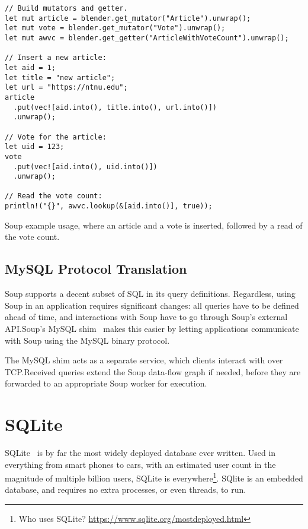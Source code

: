 \begin{listing}[H]
  \begin{verbatim}
// Build mutators and getter.
let mut article = blender.get_mutator("Article").unwrap();
let mut vote = blender.get_mutator("Vote").unwrap();
let mut awvc = blender.get_getter("ArticleWithVoteCount").unwrap();

// Insert a new article:
let aid = 1;
let title = "new article";
let url = "https://ntnu.edu";
article
  .put(vec![aid.into(), title.into(), url.into()])
  .unwrap();

// Vote for the article:
let uid = 123;
vote
  .put(vec![aid.into(), uid.into()])
  .unwrap();

// Read the vote count:
println!("{}", awvc.lookup(&[aid.into()], true));
  \end{verbatim}

  \caption{Soup example usage, where an article and a vote is inserted,
  followed by a read of the vote count.}\label{lst:soup-api}
\end{listing}

\subsection{MySQL Protocol Translation}\label{sec:mysql-shim}

Soup supports a decent subset of SQL in its query definitions. Regardless, using
Soup in an application requires significant changes: all queries have to be
defined ahead of time, and interactions with Soup have to go through Soup's
external API.\@ Soup's MySQL shim~\cite{soup-mysql} makes this easier by letting
applications communicate with Soup using the MySQL binary protocol.

The MySQL shim acts as a separate service, which clients interact with over
TCP.\@ Received queries extend the Soup data-flow graph if needed, before they
are forwarded to an appropriate Soup worker for execution.


\section{SQLite}\label{sec:sqlite}
SQLite~\cite{sqlite} is by far the most widely deployed database ever written.
Used in everything from smart phones to cars, with an estimated user count in
the magnitude of multiple billion users, SQLite is everywhere\footnote{Who
uses SQLite? \url{https://www.sqlite.org/mostdeployed.html}}. SQlite is an
embedded database, and requires no extra processes, or even threads, to run.

